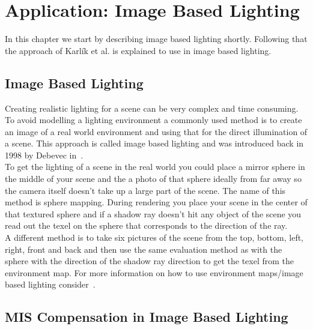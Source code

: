 \chapter{Application: Image Based Lighting}
\label{ch:application_ibl}
In this chapter we start by describing image based lighting shortly.
Following that the approach of Karl\'ik et al. is explained to use in image based lighting.


\section{Image Based Lighting}
\label{sec:ibl}
Creating realistic lighting for a scene can be very complex and time consuming.
To avoid modelling a lighting environment a commonly used method is to create an image of a real world environment
and using that for the direct illumination of a scene.
This approach is called image based lighting and was introduced back in 1998 by Debevec in~\cite{debevec}.\\
To get the lighting of a scene in the real world you could place a mirror sphere in the middle of your scene
and the a photo of that sphere ideally from far away
so the camera itself doesn't take up a large part of the scene.
The name of this method is sphere mapping.
During rendering you place your scene in the center of that textured sphere
and if a shadow ray doesn't hit any object of the scene you read out the texel
on the sphere that corresponds to the direction of the ray.\\
A different method is to take six pictures of the scene from the top, bottom, left, right, front and back
and then use the same evaluation method as with the sphere with the direction of the shadow ray direction
to get the texel from the environment map.
For more information on how to use environment maps/image based lighting consider~\cite{environment_map}.


\section{MIS Compensation in Image Based Lighting}
\label{sec:misc_ibl}


